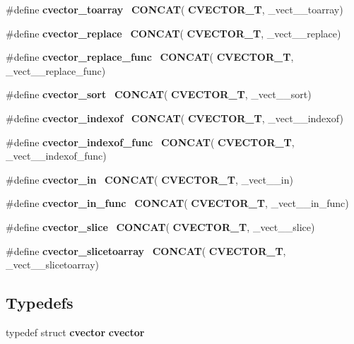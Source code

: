 \begin{DoxyCompactItemize}
\item 
\#define \textbf{ cvector\+\_\+toarray}~\textbf{ C\+O\+N\+C\+AT}(\textbf{ C\+V\+E\+C\+T\+O\+R\+\_\+T}, \+\_\+vect\+\_\+\+\_\+toarray)
\item 
\#define \textbf{ cvector\+\_\+replace}~\textbf{ C\+O\+N\+C\+AT}(\textbf{ C\+V\+E\+C\+T\+O\+R\+\_\+T}, \+\_\+vect\+\_\+\+\_\+replace)
\item 
\#define \textbf{ cvector\+\_\+replace\+\_\+func}~\textbf{ C\+O\+N\+C\+AT}(\textbf{ C\+V\+E\+C\+T\+O\+R\+\_\+T}, \+\_\+vect\+\_\+\+\_\+replace\+\_\+func)
\item 
\#define \textbf{ cvector\+\_\+sort}~\textbf{ C\+O\+N\+C\+AT}(\textbf{ C\+V\+E\+C\+T\+O\+R\+\_\+T}, \+\_\+vect\+\_\+\+\_\+sort)
\item 
\#define \textbf{ cvector\+\_\+indexof}~\textbf{ C\+O\+N\+C\+AT}(\textbf{ C\+V\+E\+C\+T\+O\+R\+\_\+T}, \+\_\+vect\+\_\+\+\_\+indexof)
\item 
\#define \textbf{ cvector\+\_\+indexof\+\_\+func}~\textbf{ C\+O\+N\+C\+AT}(\textbf{ C\+V\+E\+C\+T\+O\+R\+\_\+T}, \+\_\+vect\+\_\+\+\_\+indexof\+\_\+func)
\item 
\#define \textbf{ cvector\+\_\+in}~\textbf{ C\+O\+N\+C\+AT}(\textbf{ C\+V\+E\+C\+T\+O\+R\+\_\+T}, \+\_\+vect\+\_\+\+\_\+in)
\item 
\#define \textbf{ cvector\+\_\+in\+\_\+func}~\textbf{ C\+O\+N\+C\+AT}(\textbf{ C\+V\+E\+C\+T\+O\+R\+\_\+T}, \+\_\+vect\+\_\+\+\_\+in\+\_\+func)
\item 
\#define \textbf{ cvector\+\_\+slice}~\textbf{ C\+O\+N\+C\+AT}(\textbf{ C\+V\+E\+C\+T\+O\+R\+\_\+T}, \+\_\+vect\+\_\+\+\_\+slice)
\item 
\#define \textbf{ cvector\+\_\+slicetoarray}~\textbf{ C\+O\+N\+C\+AT}(\textbf{ C\+V\+E\+C\+T\+O\+R\+\_\+T}, \+\_\+vect\+\_\+\+\_\+slicetoarray)
\end{DoxyCompactItemize}
\subsection*{Typedefs}
\begin{DoxyCompactItemize}
\item 
typedef struct \textbf{ cvector} \textbf{ cvector}
\end{DoxyCompactItemize}
